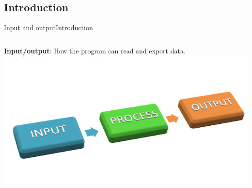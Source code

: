 \documentclass[10pt,compress]{beamer} %
\begin{document}
\subsection{Introduction}
\begin{frame}[fragile]{Input and output}{Introduction}
    \begin{columns}
			\textbf{Input/output}: How the program can read and export data.
  		\includegraphics[width=\textwidth]{figs/io.png}\\
	\end{columns}


\end{frame}
\end{document}
